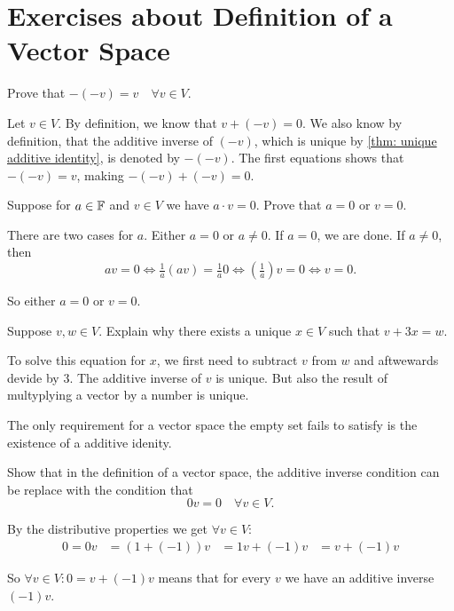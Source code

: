 \section*{Exercises about Definition of a Vector Space}

\begin{xrcs}
  Prove that $-(-v) = v \quad \forall v \in V$.

  \begin{xprf}
    Let $v \in V$. By definition, we know that $v + (-v) = 0$. We also know by definition, that the additive inverse of $(-v)$, which is unique by \ref{thm: unique additive identity}, is denoted by $-(-v)$. The first equations shows that $-(-v) = v$, making $-(-v) + (-v) = 0$.
  \end{xprf}
\end{xrcs}

\begin{xrcs}
  Suppose for $a \in \mathbb{F}$ and $v \in V$ we have $a \cdot v = 0$. Prove that $a=0$ or $v=0$.

  \begin{xprf}
    There are two cases for $a$. Either $a=0$ or $a\neq 0$. If $a=0$, we are done. If $a \neq 0$, then
    \[
    av=0 \iff \tfrac{1}{a}(av)=\tfrac{1}{a}0 \iff \left(\tfrac{1}{a} \right)v = 0 \iff v = 0.
    \]

    So either $a=0$ or $v=0$.
  \end{xprf}
\end{xrcs}


\begin{xrcs}
  Suppose $v,w \in V$. Explain why there exists a unique $x \in V$ such that $v + 3x = w$.

  \begin{xsol}
    To solve this equation for $x$, we first need to subtract $v$ from $w$ and aftwewards devide by $3$. The additive inverse of $v$ is unique. But also the result of multyplying a vector by a number is unique.
  \end{xsol}
\end{xrcs}

\begin{xrcs}
   The only requirement for a vector space the empty set fails to satisfy is the existence of a additive idenity.
\end{xrcs}

\begin{xrcs}
  Show that in the definition of a vector space, the additive inverse condition can be replace with the condition that
  \[
    0v = 0 \quad \forall v \in V.
  \]

  \begin{xprf}
    By the distributive properties we get $\forall v \in V:$
    \[
    \begin{aligned}
      0 = 0v &= (1 + (-1))v
      &= 1v + (-1)v
      &= v + (-1)v
    \end{aligned}
    \]

    So $\forall v \in V: 0= v + (-1)v$ means that for every $v$ we have an additive inverse $(-1)v$.
  \end{xprf}
\end{xrcs}
